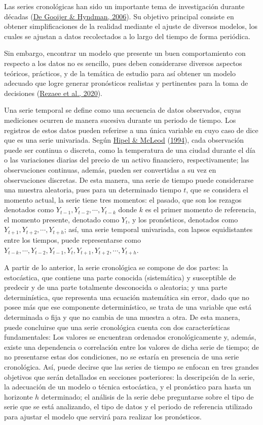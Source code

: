 \documentclass[
]{article}
\begin{document}
Las series cronológicas han sido un importante tema de investigación
durante décadas (\protect\hyperlink{ref-tsa_decades}{De Gooijer \&
Hyndman, 2006}). Su objetivo principal consiste en obtener
simplificaciones de la realidad mediante el ajuste de diversos modelos,
los cuales se ajustan a datos recolectados a lo largo del tiempo de
forma periódica.

Sin embargo, encontrar un modelo que presente un buen comportamiento con
respecto a los datos no es sencillo, pues deben considerarse diversos
aspectos teóricos, prácticos, y de la temática de estudio para así
obtener un modelo adecuado que logre generar pronósticos realistas y
pertinentes para la toma de decisiones
(\protect\hyperlink{ref-tsa_decision_making}{Rezaee et al., 2020}).

Una serie temporal se define como una secuencia de datos observados,
cuyas mediciones ocurren de manera sucesiva durante un periodo de
tiempo. Los registros de estos datos pueden referirse a una única
variable en cuyo caso de dice que es una serie univariada. Según
\protect\hyperlink{ref-Hipel}{Hipel \& McLeod}
(\protect\hyperlink{ref-Hipel}{1994}), cada observación puede ser
continua o discreta, como la temperatura de una ciudad durante el día o
las variaciones diarias del precio de un activo financiero,
respectivamente; las observaciones continuas, además, pueden ser
convertidas a su vez en observaciones discretas. De esta manera, una
serie de tiempo puede considerarse una muestra aleatoria, pues para un
determinado tiempo \(t\), que se considera el momento actual, la serie
tiene tres momentos: el pasado, que son los rezagos denotados como
\(Y_{t-1}, Y_{t-2}, \cdots, Y_{t-k}\) donde \(k\) es el primer momento
de referencia, el momento presente, denotado como \(Y_t\), y los
pronósticos, denotados como \(Y_{t+1}, Y_{t+2}, \cdots, Y_{t+h}\); así,
una serie temporal univariada, con lapsos equidistantes entre los
tiempos, puede representarse como
\(Y_{t-k}, \cdots, Y_{t-2}, Y_{t-1}, Y_t, Y_{t+1}, Y_{t+2}, \cdots, Y_{t+h}\).

A partir de lo anterior, la serie cronológica se compone de dos partes:
la estocástica, que contiene una parte conocida (sistemática) y
susceptible de predecir y de una parte totalmente desconocida o
aleatoria; y una parte determinística, que representa una ecuación
matemática sin error, dado que no posee más que ese componente
determinístico, se trata de una variable que está determinada o fija y
que no cambia de una muestra a otra. De esta manera, puede concluirse
que una serie cronológica cuenta con dos características fundamentales:
Los valores se encuentran ordenados cronológicamente y, además, existe
una dependencia o correlación entre los valores de dicha serie de
tiempo; de no presentarse estas dos condiciones, no se estaría en
presencia de una serie cronológica. Así, puede decirse que las series de
tiempo se enfocan en tres grandes objetivos que serán detallados en
secciones posteriores: la descripción de la serie, la adecuación de un
modelo o técnica estocástica, y el pronóstico para hasta un horizonte
\(h\) determinado; el análisis de la serie debe preguntarse sobre el
tipo de serie que se está analizando, el tipo de datos y el periodo de
referencia utilizado para ajustar el modelo que servirá para realizar
los pronósticos.
\end{document}
